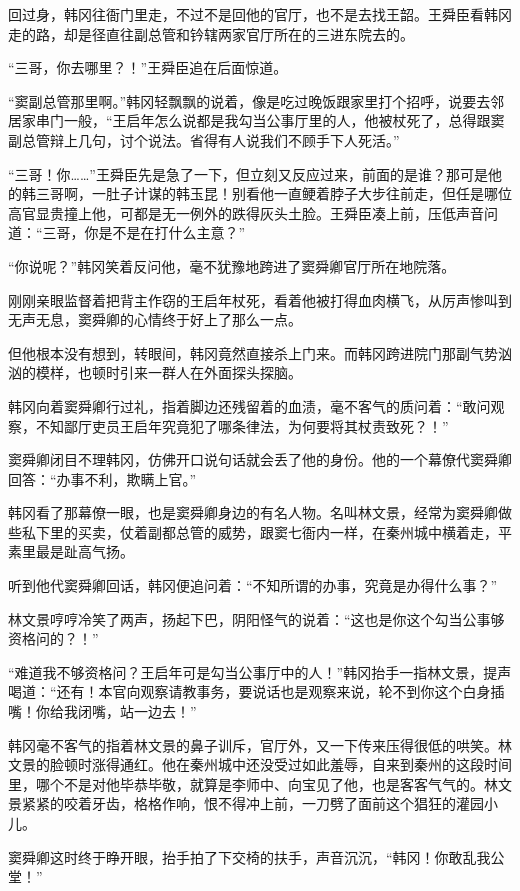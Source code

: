 回过身，韩冈往衙门里走，不过不是回他的官厅，也不是去找王韶。王舜臣看韩冈走的路，却是径直往副总管和钤辖两家官厅所在的三进东院去的。

“三哥，你去哪里？！”王舜臣追在后面惊道。

“窦副总管那里啊。”韩冈轻飘飘的说着，像是吃过晚饭跟家里打个招呼，说要去邻居家串门一般，“王启年怎么说都是我勾当公事厅里的人，他被杖死了，总得跟窦副总管辩上几句，讨个说法。省得有人说我们不顾手下人死活。”

“三哥！你……”王舜臣先是急了一下，但立刻又反应过来，前面的是谁？那可是他的韩三哥啊，一肚子计谋的韩玉昆！别看他一直鲠着脖子大步往前走，但任是哪位高官显贵撞上他，可都是无一例外的跌得灰头土脸。王舜臣凑上前，压低声音问道：“三哥，你是不是在打什么主意？”

“你说呢？”韩冈笑着反问他，毫不犹豫地跨进了窦舜卿官厅所在地院落。

刚刚亲眼监督着把背主作窃的王启年杖死，看着他被打得血肉横飞，从厉声惨叫到无声无息，窦舜卿的心情终于好上了那么一点。

但他根本没有想到，转眼间，韩冈竟然直接杀上门来。而韩冈跨进院门那副气势汹汹的模样，也顿时引来一群人在外面探头探脑。

韩冈向着窦舜卿行过礼，指着脚边还残留着的血渍，毫不客气的质问着：“敢问观察，不知鄙厅吏员王启年究竟犯了哪条律法，为何要将其杖责致死？！”

窦舜卿闭目不理韩冈，仿佛开口说句话就会丢了他的身份。他的一个幕僚代窦舜卿回答：“办事不利，欺瞒上官。”

韩冈看了那幕僚一眼，也是窦舜卿身边的有名人物。名叫林文景，经常为窦舜卿做些私下里的买卖，仗着副都总管的威势，跟窦七衙内一样，在秦州城中横着走，平素里最是趾高气扬。

听到他代窦舜卿回话，韩冈便追问着：“不知所谓的办事，究竟是办得什么事？”

林文景哼哼冷笑了两声，扬起下巴，阴阳怪气的说着：“这也是你这个勾当公事够资格问的？！”

“难道我不够资格问？王启年可是勾当公事厅中的人！”韩冈抬手一指林文景，提声喝道：“还有！本官向观察请教事务，要说话也是观察来说，轮不到你这个白身插嘴！你给我闭嘴，站一边去！”

韩冈毫不客气的指着林文景的鼻子训斥，官厅外，又一下传来压得很低的哄笑。林文景的脸顿时涨得通红。他在秦州城中还没受过如此羞辱，自来到秦州的这段时间里，哪个不是对他毕恭毕敬，就算是李师中、向宝见了他，也是客客气气的。林文景紧紧的咬着牙齿，格格作响，恨不得冲上前，一刀劈了面前这个猖狂的灌园小儿。

窦舜卿这时终于睁开眼，抬手拍了下交椅的扶手，声音沉沉，“韩冈！你敢乱我公堂！”

